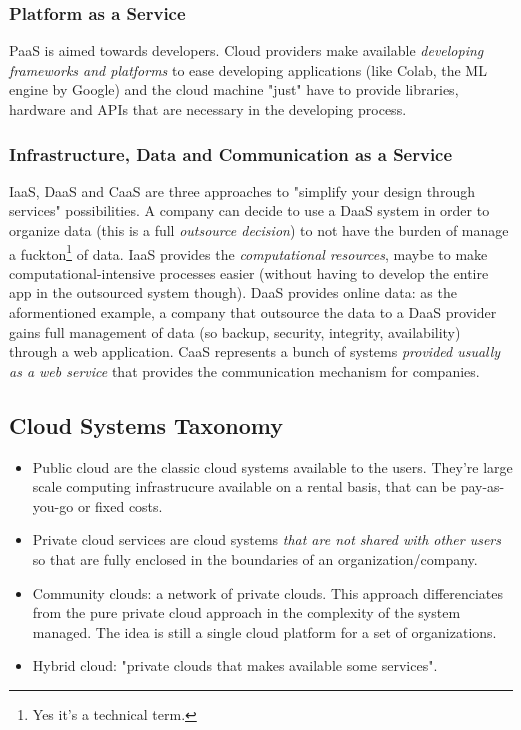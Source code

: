 \documentclass{article}
\begin{document}
				\subsubsection{Platform as a Service}
					PaaS is aimed towards developers. Cloud providers make available \emph{developing frameworks and platforms} to ease developing applications (like Colab, the ML engine by Google) and the cloud machine "just" have to provide libraries, hardware and APIs that are necessary in the developing process.
				
				\subsubsection{Infrastructure, Data and Communication as a Service}
					IaaS, DaaS and CaaS are three approaches to "simplify your design through services" possibilities. A company can decide to use a DaaS system in order to organize data (this is a full \emph{outsource decision}) to not have the burden of manage a fuckton\footnote{Yes it's a technical term.} of data. IaaS provides the \emph{computational resources}, maybe to make computational-intensive processes easier (without having to develop the entire app in the outsourced system though). DaaS provides online data: as the aformentioned example, a company that outsource the data to a DaaS provider gains full management of data (so backup, security, integrity, availability) through a web application. CaaS represents a bunch of systems \emph{provided usually as a web service} that provides the communication mechanism for companies. 
				
			\subsection{Cloud Systems Taxonomy}
				\begin{itemize}
					\item Public cloud are the classic cloud systems available to the users. They're large scale computing infrastrucure available on a rental basis, that can be pay-as-you-go or fixed costs.
					\item Private cloud services are cloud systems \emph{that are not shared with other users} so that are fully enclosed in the boundaries of an organization/company.
					\item Community clouds: a network of private clouds. This approach differenciates from the pure private cloud approach in the complexity of the system managed. The idea is still a single cloud platform for a set of organizations.
					\item Hybrid cloud: "private clouds that makes available some services".
				\end{itemize}
				
\end{document}
